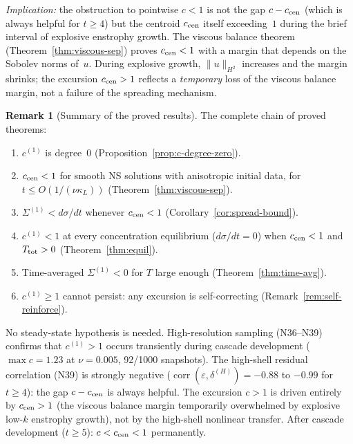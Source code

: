\documentclass[11pt]{article}
\theoremstyle{definition}
\newtheorem{remark}[theorem]{Remark}
\DeclareMathOperator{\corr}{corr}
\begin{document}
\emph{Implication:} the obstruction to pointwise
$c<1$ is not the gap $c-c_{\rm cen}$ (which is
always helpful for $t\geq 4$) but the centroid
$c_{\rm cen}$ itself exceeding~$1$ during the
brief interval of explosive enstrophy growth.
The viscous balance theorem
(Theorem~\ref{thm:viscous-sep}) proves
$c_{\rm cen}<1$ with a margin that depends on
the Sobolev norms of~$u$.  During explosive growth,
$\|u\|_{H^2}$ increases and the margin shrinks;
the excursion $c_{\rm cen}>1$ reflects a
\emph{temporary} loss of the viscous balance
margin, not a failure of the spreading mechanism.

\begin{remark}[Summary of the proved results]
\label{rem:proved-summary}
The complete chain of proved theorems:
\begin{enumerate}[nosep]
\item $c^{(1)}$ is degree~$0$
  (Proposition~\ref{prop:c-degree-zero}).
\item $c_{\rm cen}<1$ for smooth NS solutions
  with anisotropic initial data, for
  $t\leq O(1/(\nu\kappa_L))$
  (Theorem~\ref{thm:viscous-sep}).
\item $\Sigma^{(1)} < d\sigma/dt$ whenever
  $c_{\rm cen}<1$
  (Corollary~\ref{cor:spread-bound}).
\item $c^{(1)}<1$ at every concentration
  equilibrium ($d\sigma/dt=0$) when
  $c_{\rm cen}<1$ and $T_{\rm tot}>0$
  (Theorem~\ref{thm:equil}).
\item Time-averaged $\Sigma^{(1)}<0$ for
  $T$ large enough
  (Theorem~\ref{thm:time-avg}).
\item $c^{(1)}\geq 1$ cannot persist: any
  excursion is self-correcting
  (Remark~\ref{rem:self-reinforce}).
\end{enumerate}
No steady-state hypothesis is needed.
High-resolution sampling (N36--N39) confirms
that $c^{(1)}>1$ occurs transiently during
cascade development ($\max c = 1.23$ at
$\nu=0.005$, 92/1000 snapshots).  The high-shell
residual correlation (N39) is strongly negative
($\corr(\varepsilon,\delta^{(H)})=-0.88$ to
$-0.99$ for $t\geq 4$): the gap $c-c_{\rm cen}$
is always helpful.  The excursion $c>1$ is driven
entirely by $c_{\rm cen}>1$ (the viscous balance
margin temporarily overwhelmed by explosive
low-$k$ enstrophy growth), not by the high-shell
nonlinear transfer.  After cascade development
($t\geq 5$): $c<c_{\rm cen}<1$ permanently.
\end{remark}


\end{document}
